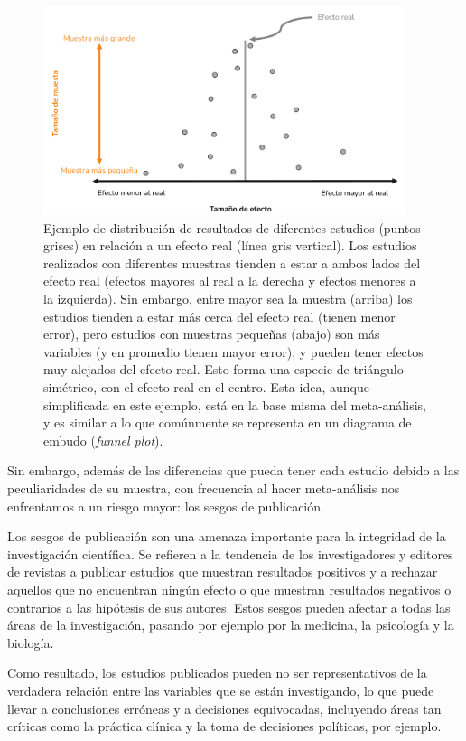 \documentclass[
  bookmarksnumbered]{article}
\begin{document}
\begin{figure}

{\centering \includegraphics[width=400px]{images/Teoria-meta} 

}

\caption{Ejemplo de distribución de resultados de diferentes estudios (puntos grises) en relación a un efecto real (línea gris vertical). Los estudios realizados con diferentes muestras tienden a estar a ambos lados del efecto real (efectos mayores al real a la derecha y efectos menores a la izquierda). Sin embargo, entre mayor sea la muestra (arriba) los estudios tienden a estar más cerca del efecto real (tienen menor error), pero estudios con muestras pequeñas (abajo) son más variables (y en promedio tienen mayor error), y pueden tener efectos muy alejados del efecto real. Esto forma una especie de triángulo simétrico, con el efecto real en el centro. Esta idea, aunque simplificada en este ejemplo, está en la base misma del meta-análisis, y es similar a lo que comúnmente se representa en un diagrama de embudo (\textit{funnel plot}).}\label{fig:teoria-meta1}
\end{figure}

Sin embargo, además de las diferencias que pueda tener cada estudio debido a las peculiaridades de su muestra, con frecuencia al hacer meta-análisis nos enfrentamos a un riesgo mayor: los sesgos de publicación.

Los sesgos de publicación son una amenaza importante para la integridad de la investigación científica. Se refieren a la tendencia de los investigadores y editores de revistas a publicar estudios que muestran resultados positivos y a rechazar aquellos que no encuentran ningún efecto o que muestran resultados negativos o contrarios a las hipótesis de sus autores. Estos sesgos pueden afectar a todas las áreas de la investigación, pasando por ejemplo por la medicina, la psicología y la biología.

Como resultado, los estudios publicados pueden no ser representativos de la verdadera relación entre las variables que se están investigando, lo que puede llevar a conclusiones erróneas y a decisiones equivocadas, incluyendo áreas tan críticas como la práctica clínica y la toma de decisiones políticas, por ejemplo.
\end{document}
